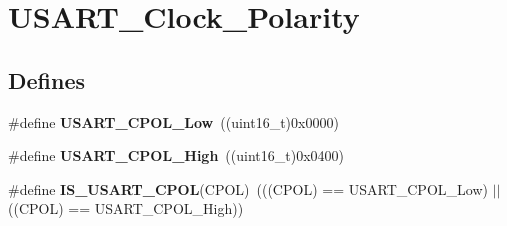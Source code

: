 \hypertarget{group__USART__Clock__Polarity}{
\section{USART\_\-Clock\_\-Polarity}
\label{group__USART__Clock__Polarity}
}
\subsection*{Defines}
\begin{DoxyCompactItemize}
\item 
\hypertarget{group__USART__Clock__Polarity_ga194d60b47d8042d39e843c52f3a6aa1a}{
\#define {\bfseries USART\_\-CPOL\_\-Low}~((uint16\_\-t)0x0000)}
\label{group__USART__Clock__Polarity_ga194d60b47d8042d39e843c52f3a6aa1a}

\item 
\hypertarget{group__USART__Clock__Polarity_ga4ba6946dd9f0b4fd38115f24798c210f}{
\#define {\bfseries USART\_\-CPOL\_\-High}~((uint16\_\-t)0x0400)}
\label{group__USART__Clock__Polarity_ga4ba6946dd9f0b4fd38115f24798c210f}

\item 
\hypertarget{group__USART__Clock__Polarity_ga833e9d2e85ab84658c7a7c18bd0bc8b9}{
\#define {\bfseries IS\_\-USART\_\-CPOL}(CPOL)~(((CPOL) == USART\_\-CPOL\_\-Low) $|$$|$ ((CPOL) == USART\_\-CPOL\_\-High))}
\label{group__USART__Clock__Polarity_ga833e9d2e85ab84658c7a7c18bd0bc8b9}

\end{DoxyCompactItemize}

